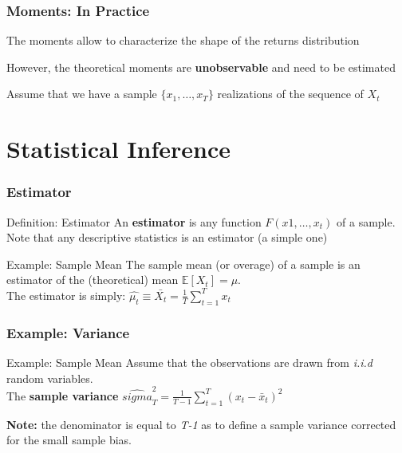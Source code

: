 \documentclass{beamer}
\newenvironment{wideitemize}{\itemize\addtolength{\itemsep}{10pt}}{\enditemize}
\begin{document}
\begin{frame}
  \frametitle{Moments: In Practice}

  \begin{wideitemize}
    \item The moments allow to characterize the shape of the returns distribution
    \item However, the theoretical moments are \textbf{unobservable} and need to be estimated
    \item Assume that we have a sample $\{x_1, \dots, x_T\}$ realizations of the sequence of $X_t$
  \end{wideitemize}
  
\end{frame}


\section{Statistical Inference}
\begin{frame}
  \frametitle{Estimator}

  \begin{block}{Definition: Estimator}
    An \textbf{estimator} is any function $F(x1, \dots, x_t)$ of a sample. Note that any descriptive statistics is an estimator (a simple one) 
  \end{block}


  \begin{exampleblock}{Example: Sample Mean}
    The sample mean (or overage) of a sample is an estimator of the (theoretical) mean $ \mathbb{E}[X_t] = \mu$.\\
    The estimator is simply: $\hat{\mu_t} \equiv \bar{X_t} = \frac{1}{T} \sum_{t=1}^{T}x_t$
  \end{exampleblock}
  
\end{frame}


\begin{frame}
  \frametitle{Example: Variance}

  \begin{exampleblock}{Example: Sample Mean}
    Assume that the observations are drawn from \emph{i.i.d} random variables.\\
    The \textbf{sample variance} $\hat{sigma}^2_T = \frac{1}{T-1} \sum_{t=1}^T (x_t - \bar{x}_t)^2$
  \end{exampleblock}

\textbf{Note:} the denominator is equal to \emph{T-1} as to define a sample variance corrected for the small sample bias. 
  
\end{frame}
\end{document}
